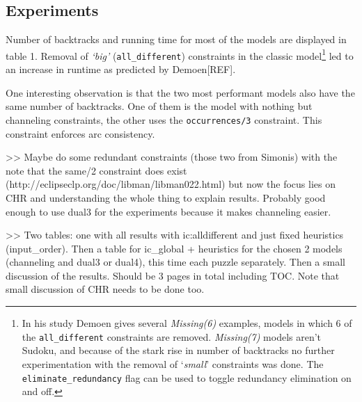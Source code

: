 \subsection{Experiments}

Number of backtracks and running time for most of the models are displayed in table 1. Removal of \textit{`big'} (\texttt{all\_different}) constraints in the classic model\footnote{In his study Demoen gives several \textit{Missing(6)} examples, models in which 6 of the \texttt{all\_different} constraints are removed. \textit{Missing(7)} models aren't Sudoku, and because of the stark rise in number of backtracks no further experimentation with the removal of `\textit{small}' constraints was done. The \texttt{eliminate\_redundancy} flag can be used to toggle redundancy elimination on and off.} led to an increase in runtime as predicted by Demoen[REF]. \\\par

One interesting observation is that the two most performant models also have the same number of backtracks. One of them is the model with nothing but channeling constraints, the other uses the \texttt{occurrences/3} constraint. This constraint enforces arc consistency.\\\par

>> Maybe do some redundant constraints (those two from Simonis) with the note that the same/2 constraint does exist (http://eclipseclp.org/doc/libman/libman022.html) but now the focus lies on CHR and understanding the whole thing to explain results. Probably good enough to use dual3 for the experiments because it makes channeling easier.\\\par

>> Two tables: one with all results with ic:alldifferent and just fixed heuristics (input\_order). Then a table for ic\_global + heuristics for the chosen 2 models (channeling and dual3 or dual4), this time each puzzle separately. Then a small discussion of the results. Should be 3 pages in total including TOC. Note that small discussion of CHR needs to be done too.